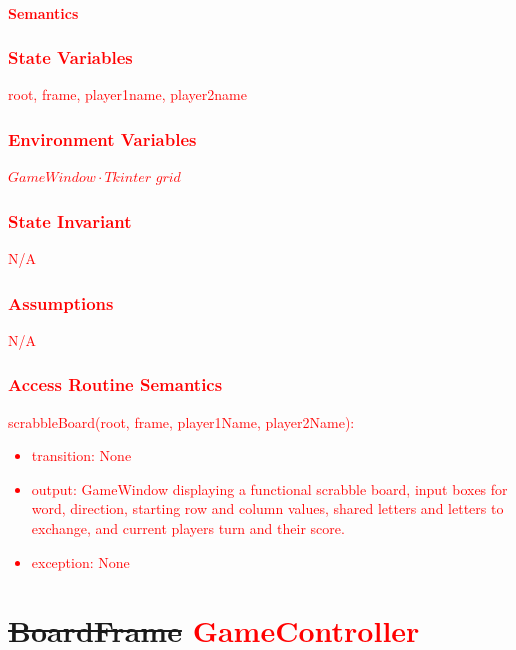 \documentclass[12pt]{article}
\begin{document}
\paragraph* {\textcolor{red}{Semantics}}

\subsubsection*{\textcolor{red}{State Variables}}

\textcolor{red}{root, frame, player1name, player2name}

\subsubsection*{\textcolor{red}{Environment Variables}}

\textcolor{red}{$GameWindow \cdot Tkinter$  $grid$}

\subsubsection*{\textcolor{red}{State Invariant}}

\textcolor{red}{N/A}

\subsubsection*{\textcolor{red}{Assumptions}}

\textcolor{red}{N/A}

\subsubsection* {\textcolor{red}{Access Routine Semantics}}

\textcolor{red}{\noindent scrabbleBoard(root, frame, player1Name, player2Name):
\begin{itemize}
\item transition: None
\item output: \textcolor{red}{GameWindow} displaying a functional scrabble board, input boxes for word, direction, starting row and column values, shared letters and letters to exchange,  and  current players turn and their score.
\item exception: None
\end{itemize}
}
\newpage

\section*{\sout{BoardFrame} \textcolor{red}{GameController}}
\end{document}
